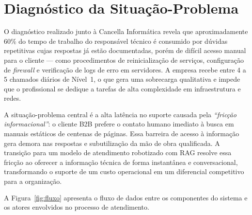 \documentclass[a4paper,12pt,Times]{article}
\begin{document}
\section{Diagnóstico da Situação-Problema}

O diagnóstico realizado junto à Cancella Informática revela que aproximadamente 60\% do
tempo de trabalho do responsável técnico é consumido por dúvidas repetitivas cujas respostas
já estão documentadas, porém de difícil acesso manual para o cliente — como procedimentos
de reinicialização de serviços, configuração de \textit{firewall} e verificação de logs de
erro em servidores. A empresa recebe entre 4 a 5 chamados diários de Nível~1, o que gera
uma sobrecarga qualitativa e impede que o profissional se dedique a tarefas de alta
complexidade em infraestrutura e redes.

A situação-problema central é a alta latência no suporte causada pela
\textit{``fricção informacional''}: o cliente B2B prefere o contato humano imediato à busca
em manuais estáticos de centenas de páginas. Essa barreira de acesso à informação gera
demora nas respostas e subutilização da mão de obra qualificada. A transição para um modelo
de atendimento robotizado com RAG resolve essa fricção ao oferecer a informação técnica de
forma instantânea e conversacional, transformando o suporte de um custo operacional em um
diferencial competitivo para a organização.

A Figura~\ref{fig:fluxo} apresenta o fluxo de dados entre os componentes do sistema e
os atores envolvidos no processo de atendimento.
\end{document}
